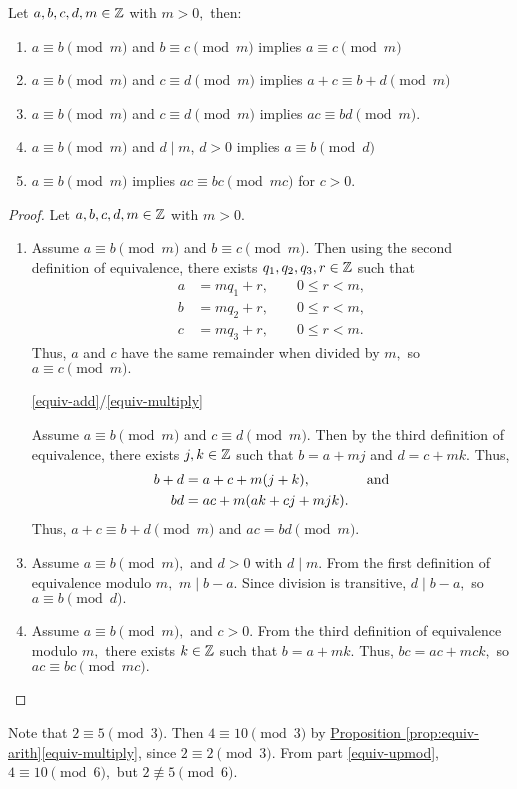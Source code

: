 \documentclass{ximera}
\begin{document}
    \begin{proposition}\label{prop:equiv-arith}%
     Let $a,b,c,d,m\in\mathbb Z$ with $m>0,$ then:
    \begin{enumerate}
    \item $a\equiv b \pmod{m}$ and $b\equiv c \pmod{m}$ implies $a\equiv c \pmod{m}$
    \item\label{equiv-add} $a\equiv b \pmod{m}$ and $c\equiv d \pmod{m}$ implies $a+c \equiv b+d \pmod{m}$ 
    \item\label{equiv-multiply} $a\equiv b\pmod{m}$ and $c\equiv d \pmod{m}$ implies $ac\equiv bd \pmod{m}$.
    \item $a\equiv b \pmod{m}$ and $d\mid m$, $d>0$ implies $a\equiv b \pmod{d}$
    \item\label{equiv-upmod} $a\equiv b \pmod{m}$ implies $ac\equiv bc \pmod{mc}$ for $c>0$.
    \end{enumerate}
    \end{proposition}
    \begin{proof}
      Let $a,b,c,d,m\in\mathbb Z$ with $m>0.$
      
    \begin{enumerate}
      \item Assume $a\equiv b \pmod{m}$ and $b\equiv c \pmod{m}.$ Then using the second definition of equivalence, there exists $q_1,q_2,q_3,r\in\mathbb Z$ such that 
      \begin{align*}
        a&=mq_1+r, \qquad 0\leq r<m,\\
        b&=mq_2+r, \qquad 0\leq r<m,\\
        c&=mq_3+r, \qquad 0\leq r<m. 
      \end{align*}
      Thus, $a$ and $c$ have the same remainder when divided by $m,$ so $a\equiv c\pmod m.$
    
      \item[\ref{equiv-add}/\ref{equiv-multiply}] \addtocounter{enumi}{2}
      Assume $a\equiv b \pmod{m}$ and $c\equiv d \pmod{m}.$ Then by the third definition of equivalence, there exists $j,k\in\mathbb Z$ such that $b=a+mj$ and $d=c+mk.$ Thus, 
      \begin{align*}
        b+d&=a+c+m(j+k), \qquad\qquad\textnormal{and}\\
        bd &= ac+m(ak+cj+mjk).
      \end{align*}
      Thus, $a+c\equiv b+d\pmod m$ and $ac=bd\pmod m.$
    
      \item Assume $a\equiv b \pmod{m},$ and $d>0$ with $d\mid m.$ From the first definition of equivalence modulo $m,$ $m\mid b-a$. Since division is transitive, $d\mid b-a,$ so $a\equiv b\pmod d.$
    
      \item Assume $a\equiv b \pmod{m},$ and $c>0.$ From the third definition of equivalence modulo $m,$ there exists $k\in\mathbb Z$ such that $b=a+mk.$ Thus, $bc=ac+mck,$ so $ac\equiv bc \pmod{mc}.$ \qedhere
    \end{enumerate}
    \end{proof}
    
    \begin{example}
    Note that $2\equiv 5 \pmod 3$. Then $4\equiv 10 \pmod 3$ by \hyperref[equiv-multiply]{Proposition \ref{prop:equiv-arith}\ref{equiv-multiply}}, since $2\equiv 2\pmod 3.$ From part \ref{equiv-upmod}, $4\equiv 10 \pmod 6,$ but $2\not\equiv 5\pmod 6.$ 
    \end{example}
\end{document}
